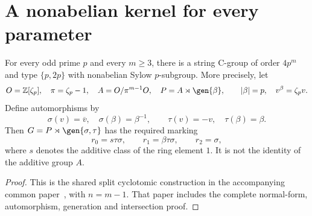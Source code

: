 \section{A nonabelian kernel for every parameter}
\begin{theorem}\label{F1.Construction}
For every odd prime $p$ and every $m\geq3$, there is a string
C-group of order $4p^m$ and type $\{p,2p\}$ with nonabelian
Sylow $p$-subgroup. More precisely, let
\[
 O=\mathbb Z[\zeta_p],\quad \pi=\zeta_p-1,\quad
 A=O/\pi^{m-1}O,\quad P=A\rtimes\gen{\beta},
 \qquad |\beta|=p,\quad v^\beta=\zeta_pv.
\]
Define automorphisms by
\[
 \sigma(v)=\overline v,\quad\sigma(\beta)=\beta^{-1},
 \qquad\tau(v)=-v,\quad\tau(\beta)=\beta.
\]
Then $G=P\rtimes\gen{\sigma,\tau}$ has the required marking
\[
 r_0=s\tau\sigma,\qquad r_1=\beta\tau\sigma,\qquad r_2=\sigma,
\]
where $s$ denotes the additive class of the ring element $1$.
It is not the identity of the additive group $A$.
\end{theorem}
\begin{proof}
This is the shared split cyclotomic construction in the accompanying
common paper~\cite{UF}, with $n=m-1$. That paper includes the complete
normal-form, automorphism, generation and intersection proof.
\end{proof}

